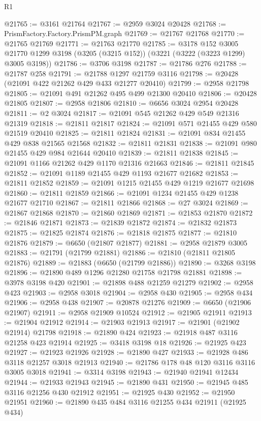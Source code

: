 \begin{lexlean}{R1}
\begin{coremodule}
@21765 := @3161 @21764
@21767 := @2959 @3024 @20428
@21768 := PrismFactory.Factory.PrismPM.graph
@21769 := @21767 @21768
@21770 := @21765 @21769
@21771 := @21763 @21770
@21785 := @3178
    @152
    @3005
    @21770
    @1299
    @3198
    (@3205 (@3215 @152))
    (@3221 (@3222 (@3223 @1299) @3005 @3198))
@21786 := @3706 @3198
@21787 := @21786 @276
@21788 := @21787 @258
@21791 := @21788 @1297 @21759 @3116
@21798 := @20428 (@21091 @422 @21262 @429 @433 @21277 @20410)
@21799 := @2958 @21798
@21805 := @21091 @491 @21262 @495 @499 @21300 @20410
@21806 := @20428 @21805
@21807 := @2958 @21806
@21810 := @6656 @3024 @2954 @20428
@21811 := @2 @3024
@21817 := @21091 @545 @21262 @429 @549 @21316 @21319
@21818 := @21811 @21817
@21824 := @21091 @571 @21455 @429 @580 @21519 @20410
@21825 := @21811 @21824
@21831 := @21091 @834 @21455 @429 @838 @21565 @21568
@21832 := @21811 @21831
@21838 := @21091 @980 @21455 @429 @984 @21644 @20410
@21839 := @21811 @21838
@21845 := @21091 @1166 @21262 @429 @1170 @21316 @21663
@21846 := @21811 @21845
@21852 := @21091 @1189 @21455 @429 @1193 @21677 @21682
@21853 := @21811 @21852
@21859 := @21091 @1215 @21455 @429 @1219 @21677 @21698
@21860 := @21811 @21859
@21866 := @21091 @1234 @21455 @429 @1238 @21677 @21710
@21867 := @21811 @21866
@21868 := @27 @3024
@21869 := @21867 @21868
@21870 := @21860 @21869
@21871 := @21853 @21870
@21872 := @21846 @21871
@21873 := @21839 @21872
@21874 := @21832 @21873
@21875 := @21825 @21874
@21876 := @21818 @21875
@21877 := @21810 @21876
@21879 := @6650 (@21807 @21877)
@21881 := @2958 @21879 @3005
@21883 := @21791 (@21799 @21881)
@21886 := @21810 (@21811 @21805 @21876)
@21889 := @21883 (@6650 (@21799 @21886))
@21890 := @3268 @3198
@21896 := @21890 @489 @1296 @21280 @21758 @21798 @21881
@21898 := @3978 @3198 @420
@21901 := @21898 @488 @21259 @21279
@21902 := @2958 @423
@21903 := @2958 @3018
@21904 := @2958 @430
@21905 := @2958 @434
@21906 := @2958 @438
@21907 := @20878 @21276
@21909 := @6650 (@21906 @21907)
@21911 := @2958 @21909 @10524
@21912 := @21905 @21911
@21913 := @21904 @21912
@21914 := @21903 @21913
@21917 := @21901 (@21902 @21914) @21798
@21918 := @21890 @424
@21923 := @21918 @487 @3116 @21258 @423 @21914
@21925 := @3418 @3198 @18
@21926 := @21925 @423
@21927 := @21923 @21926
@21928 := @21890 @427
@21933 := @21928 @486 @3118 @21257 @3018 @21913
@21940 := @21786 @178 @48 @120 @3116 @3116 @3005 @3018
@21941 := @3314 @3198
@21943 := @21940 @21941 @12434
@21944 := @21933 @21943
@21945 := @21890 @431
@21950 := @21945 @485 @3116 @21256 @430 @21912
@21951 := @21925 @430
@21952 := @21950 @21951
@21960 := @21890 @435 @484 @3116 @21255 @434 @21911 (@21925 @434)

\end{coremodule}
\end{lexlean}
